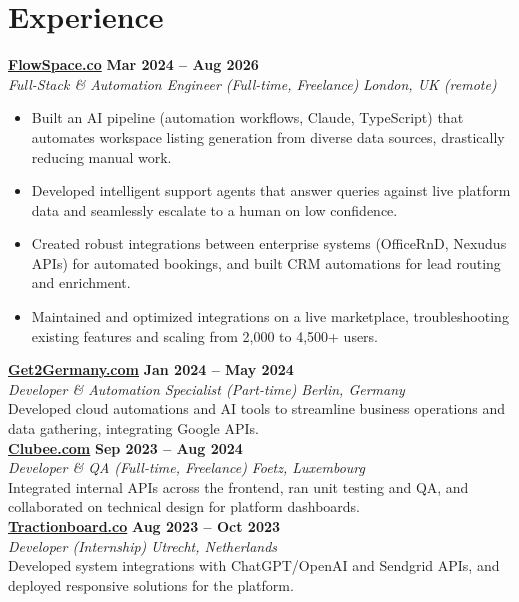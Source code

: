\documentclass[a4paper,10pt]{article}
\newcommand{\role}[4]{%
 \textbf{#1} \hfill \textbf{#2}\\[1pt]%
 \textit{#3} \hfill \textit{#4}\\[2pt]%
}
\begin{document}
\section{Experience}

\role{\href{https://flowspace.co}{FlowSpace.co}}{Mar 2024 -- Aug 2026}{Full-Stack \& Automation Engineer (Full-time, Freelance)}{London, UK (remote)}
\begin{itemize}
 \item Built an AI pipeline (automation workflows, Claude, TypeScript) that automates workspace listing generation from diverse data sources, drastically reducing manual work.
 \item Developed intelligent support agents that answer queries against live platform data and seamlessly escalate to a human on low confidence.
 \item Created robust integrations between enterprise systems (OfficeRnD, Nexudus APIs) for automated bookings, and built CRM automations for lead routing and enrichment.
 \item Maintained and optimized integrations on a live marketplace, troubleshooting existing features and scaling from 2,000 to 4,500+ users.
\end{itemize}

\role{\href{https://get2germany.com}{Get2Germany.com}}{Jan 2024 -- May 2024}{Developer \& Automation Specialist (Part-time)}{Berlin, Germany}
Developed cloud automations and AI tools to streamline business operations and data gathering, integrating Google APIs.\\[1pt]

\role{\href{https://clubee.com}{Clubee.com}}{Sep 2023 -- Aug 2024}{Developer \& QA (Full-time, Freelance)}{Foetz, Luxembourg}
Integrated internal APIs across the frontend, ran unit testing and QA, and collaborated on technical design for platform dashboards.\\[1pt]

\role{\href{https://tractionboard.co}{Tractionboard.co}}{Aug 2023 -- Oct 2023}{Developer (Internship)}{Utrecht, Netherlands}
Developed system integrations with ChatGPT/OpenAI and Sendgrid APIs, and deployed responsive solutions for the platform.

\end{document}
